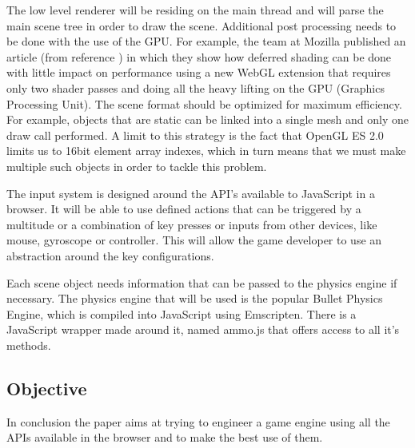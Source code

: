 The low level renderer will be residing on the main thread and will parse the main scene tree in order to draw the scene. Additional post processing needs to be done with the use of the GPU. For example, the team at Mozilla published an article (from reference \cite{tian14}) in which they show how deferred shading can be done with little impact on performance using a new WebGL extension that requires only two shader passes and doing all the heavy lifting on the GPU (Graphics Processing Unit). The scene format should be optimized for maximum efficiency. For example, objects that are static can be linked into a single mesh and only one draw call performed. A limit to this strategy is the fact that OpenGL ES 2.0 limits us to 16bit element array indexes, which in turn means that we must make multiple such objects in order to tackle this problem.

The input system is designed around the API's available to JavaScript in a browser. It will be able to use defined actions that can be triggered by a multitude or a combination of key presses or inputs from other devices, like mouse, gyroscope or controller. This will allow the game developer to use an abstraction around the key configurations.

Each scene object needs information that can be passed to the physics engine if necessary. The physics engine that will be used is the popular Bullet Physics Engine, which is compiled into JavaScript using Emscripten. There is a JavaScript wrapper made around it, named ammo.js that offers access to all it's methods.
 


\subsection{Objective}
\label{sub-sec:proj-desc-objective}

In conclusion the paper aims at trying to engineer a game engine using all the APIs available in the browser and to make the best use of them.



